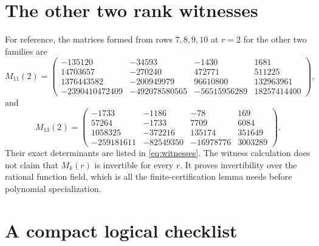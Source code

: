 \documentclass[11pt,letterpaper]{article}
\numberwithin{equation}{section}
\theoremstyle{definition}
\begin{document}
\appendix
\section{The other two rank witnesses}
\label{app:witness}

For reference, the matrices formed from rows \(7,8,9,10\) at \(r=2\)
for the other two families are
\begin{equation}
 M_{11}(2)=
 \begin{pmatrix}
 -135120&-34593&-1430&1681\\
 14703657&-270240&472771&511225\\
 1376443582&-200949979&96610800&132963961\\
 -2390410472409&-492078580565&-56515956289&18257414400
 \end{pmatrix},
\end{equation}
and
\begin{equation}
 M_{13}(2)=
 \begin{pmatrix}
 -1733&-1186&-78&169\\
 57264&-1733&7709&6084\\
 1058325&-372216&135174&351649\\
 -259181611&-82549350&-16978776&3003289
 \end{pmatrix}.
\end{equation}
Their exact determinants are listed in \eqref{eq:witnesses}. The witness
calculation does not claim that \(M_k(r)\) is invertible for every \(r\).
It proves invertibility over the rational function field, which is all the
finite-certification lemma needs before polynomial specialization.

\section{A compact logical checklist}
\label{app:checklist}
\end{document}
